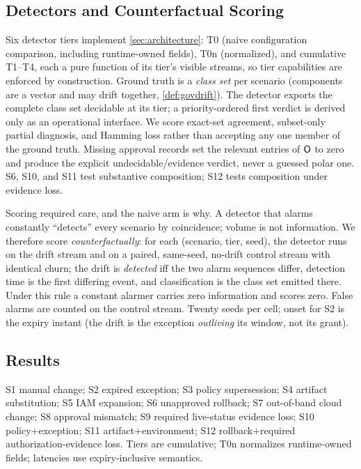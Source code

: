 \subsection{Detectors and Counterfactual Scoring}
Six detector tiers implement \cref{sec:architecture}: T0 (naive
configuration comparison, including runtime-owned fields), T0n (normalized),
and cumulative T1--T4, each a pure function of its tier's visible streams, so
tier capabilities are enforced by construction. Ground truth is a
\emph{class set} per scenario (components are a vector and may drift
together, \cref{def:govdrift}). The detector exports the complete class set
decidable at its tier; a priority-ordered first verdict is derived only as an
operational interface. We score exact-set agreement, subset-only partial
diagnosis, and Hamming loss rather than accepting any one member of the ground
truth. Missing approval records set the relevant entries of $\mathsf{O}$ to zero
and produce the explicit undecidable/evidence verdict, never a guessed polar
one. S6, S10, and S11 test substantive composition; S12 tests composition under
evidence loss.

Scoring required care, and the naive arm is why. A detector that alarms
constantly ``detects'' every scenario by coincidence; volume is not
information. We therefore score \emph{counterfactually}: for each (scenario,
tier, seed), the detector runs on the drift stream and on a paired,
same-seed, no-drift control stream with identical churn; the drift is
\emph{detected} iff the two alarm sequences differ, detection time is the
first differing event, and classification is the class set emitted there. Under
this rule a constant alarmer carries zero information and scores zero. False
alarms are counted on the control stream. Twenty seeds per cell; onset for S2
is the expiry instant (the drift is the exception \emph{outliving} its
window, not its grant).

\subsection{Results}
\begin{table}[t]
\centering
\caption{Detectability Matrix, Generated Programmatically from the Run
Outputs (20 Seeds per Cell). \cmark{} = Detected with Exact-Set Agreement in
All Seeds; $\triangle$ = Detected but Only a Correct Subset Is Decidable at
That Tier (Superscript: Mean Detection Latency in Events When $>$0);
\xmark{} = Not Detected (No Information Under Counterfactual Scoring). FP =
False Alarms per 400-Event Control Run.}
\label{tab:matrix}
\footnotesize
\resizebox{0.96\textwidth}{!}{}
\par\vspace{2pt}
\parbox{0.96\textwidth}{\scriptsize S1 manual change; S2 expired exception; S3
policy supersession; S4 artifact substitution; S5 IAM expansion; S6
unapproved rollback; S7 out-of-band cloud change; S8 approval mismatch; S9
required live-status evidence loss; S10 policy+exception; S11
artifact+environment; S12 rollback+required authorization-evidence loss.
Tiers are cumulative; T0n normalizes
runtime-owned fields; latencies use expiry-inclusive semantics.}
\end{table}

